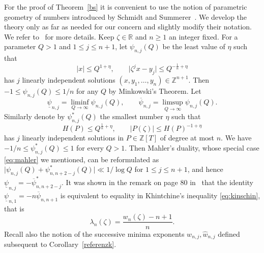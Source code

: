 \documentclass[12pt]{amsart}
\theoremstyle{definition}
\begin{document}
For the proof of Theorem~\ref{bs}
it is convenient to use the notion of parametric geometry of numbers 
introduced by Schmidt and Summerer~\cite{ss}. We develop the theory only as far as needed
for our concern and slightly modify their notation. We
refer to~\cite{ss} for more details. Keep $\zeta\in\mathbb{R}$ and $n\geq 1$ an integer fixed.
For a parameter $Q>1$ and $1\leq j\leq n+1$, let 
$\psi_{n,j}(Q)$ be the least value of $\eta$ such that
%
\[
\vert x\vert \leq Q^{1+\eta}, \qquad \vert \zeta^{j}x-y_{j}\vert \leq Q^{-\frac{1}{n}+\eta}
\]
% 
has $j$ linearly independent solutions $(x,y_{1},\ldots,y_{n})\in\mathbb{Z}^{n+1}$. 
Then $-1\leq \psi_{n,j}(Q)\leq 1/n$ for any $Q$
by Minkowski's Theorem. Let
%
\[
\underline{\psi}_{n,j}= \liminf_{Q\to\infty} \psi_{n,j}(Q), \qquad 
\overline{\psi}_{n,j}= \limsup_{Q\to\infty} \psi_{n,j}(Q).
\]
%
Similarly denote by $\psi_{n,j}^{\ast}(Q)$ the smallest
number $\eta$ such that
%
\[
H(P)\leq Q^{\frac{1}{n}+\eta}, \qquad \vert P(\zeta)\vert \leq H(P)^{-1+\eta}
\]
%
has $j$ linearly independent solutions in $P\in\mathbb{Z}[T]$ of degree at most $n$.
We have $-1/n\leq \psi_{n,j}^{\ast}(Q)\leq 1$ for every $Q>1$. 
Then Mahler's duality, whose special case \eqref{eq:mahler} we mentioned, can be reformulated as
$\vert\psi_{n,j}(Q)+\psi_{n,n+2-j}^{\ast}(Q)\vert \ll 1/\log Q$ 
for $1\leq j\leq n+1$, and hence 
$\underline{\psi}_{n,j}= -\overline{\psi}_{n,n+2-j}^{\ast}$.
It was shown in the remark on page 80 in~\cite{ss} that the identity $\underline{\psi}_{n,1}=-n\overline{\psi}_{n,n+1}$
is equivalent to equality in Khintchine's inequality \eqref{eq:kinschin}, that is
%
\[
\lambda_{n}(\zeta)=\frac{w_{n}(\zeta)-n+1}{n}.
\]
%
Recall also the notion of the successive minima exponents $w_{n,j}, \widehat{w}_{n,j}$
defined subsequent to Corollary~\ref{referenzk}.
\end{document}
